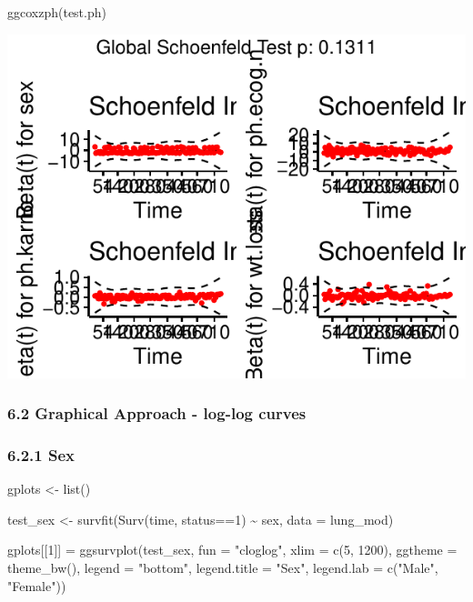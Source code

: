 \documentclass[
]{article}
\newenvironment{Shaded}{\begin{snugshade}}{\end{snugshade}}
\newcommand{\AttributeTok}[1]{\textcolor[rgb]{0.77,0.63,0.00}{#1}}
\newcommand{\DecValTok}[1]{\textcolor[rgb]{0.00,0.00,0.81}{#1}}
\newcommand{\FunctionTok}[1]{\textcolor[rgb]{0.00,0.00,0.00}{#1}}
\newcommand{\NormalTok}[1]{#1}
\newcommand{\OtherTok}[1]{\textcolor[rgb]{0.56,0.35,0.01}{#1}}
\newcommand{\SpecialCharTok}[1]{\textcolor[rgb]{0.00,0.00,0.00}{#1}}
\newcommand{\StringTok}[1]{\textcolor[rgb]{0.31,0.60,0.02}{#1}}
\begin{document}
\begin{Shaded}
\begin{Highlighting}[]
\FunctionTok{ggcoxzph}\NormalTok{(test.ph)}
\end{Highlighting}
\end{Shaded}

\includegraphics{final_project_files/figure-latex/unnamed-chunk-32-1.pdf}

\hypertarget{graphical-approach---log-log-curves}{%
\subsubsection{6.2 Graphical Approach - log-log
curves}\label{graphical-approach---log-log-curves}}

\hypertarget{sex-1}{%
\subsubsection{6.2.1 Sex}\label{sex-1}}

\begin{Shaded}
\begin{Highlighting}[]
\NormalTok{gplots }\OtherTok{\textless{}{-}} \FunctionTok{list}\NormalTok{()}

\NormalTok{test\_sex }\OtherTok{\textless{}{-}} \FunctionTok{survfit}\NormalTok{(}\FunctionTok{Surv}\NormalTok{(time, status}\SpecialCharTok{==}\DecValTok{1}\NormalTok{) }\SpecialCharTok{\textasciitilde{}}\NormalTok{ sex, }\AttributeTok{data =}\NormalTok{ lung\_mod)}

\NormalTok{gplots[[}\DecValTok{1}\NormalTok{]] }\OtherTok{=} \FunctionTok{ggsurvplot}\NormalTok{(test\_sex, }
           \AttributeTok{fun =} \StringTok{"cloglog"}\NormalTok{,}
           \AttributeTok{xlim =} \FunctionTok{c}\NormalTok{(}\DecValTok{5}\NormalTok{, }\DecValTok{1200}\NormalTok{),}
           \AttributeTok{ggtheme =} \FunctionTok{theme\_bw}\NormalTok{(), }
           \AttributeTok{legend =} \StringTok{"bottom"}\NormalTok{, }
           \AttributeTok{legend.title =} \StringTok{"Sex"}\NormalTok{,}
           \AttributeTok{legend.lab =} \FunctionTok{c}\NormalTok{(}\StringTok{"Male"}\NormalTok{, }\StringTok{"Female"}\NormalTok{))}
\end{Highlighting}
\end{Shaded}
\end{document}
